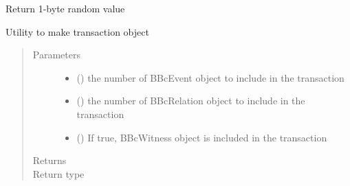 \documentclass[letterpaper,10pt,english]{sphinxmanual}
\begin{document}

\begin{fulllineitems}
\label{\detokenize{bbc1.core.bbclib:bbc1.core.bbclib.get_random_value}}
Return 1-byte random value

\end{fulllineitems}


\begin{fulllineitems}
\label{\detokenize{bbc1.core.bbclib:bbc1.core.bbclib.make_transaction}}
Utility to make transaction object
\begin{quote}\begin{description}
\item[{Parameters}] \leavevmode\begin{itemize}
\item {} 
 () \textendash{} the number of BBcEvent object to include in the transaction

\item {} 
 () \textendash{} the number of BBcRelation object to include in the transaction

\item {} 
 () \textendash{} If true, BBcWitness object is included in the transaction

\end{itemize}

\item[{Returns}] \leavevmode


\item[{Return type}] \leavevmode
{\hyperref[\detokenize{bbc1.core.bbclib:bbc1.core.bbclib.BBcTransaction}]{}}

\end{description}\end{quote}

\end{fulllineitems}
\end{document}
